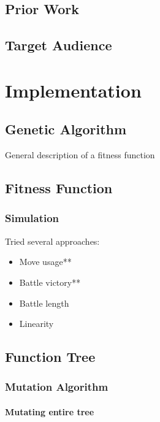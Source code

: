 \documentclass{acm_proc_article-sp}
\begin{document}
    \subsection{Prior Work}

    \subsection{Target Audience}

\section{Implementation}

    \subsection{Genetic Algorithm}
        
        General description of a fitness function
    
    \subsection{Fitness Function}
    
        \subsubsection{Simulation}
            
            Tried several approaches:
            \begin{itemize}
                \item Move usage**
                \item Battle victory**
                \item Battle length
                \item Linearity
            \end{itemize}

    \subsection{Function Tree}

        \subsubsection{Mutation Algorithm}
        
            \paragraph{Mutating entire tree}
            
\end{document}
